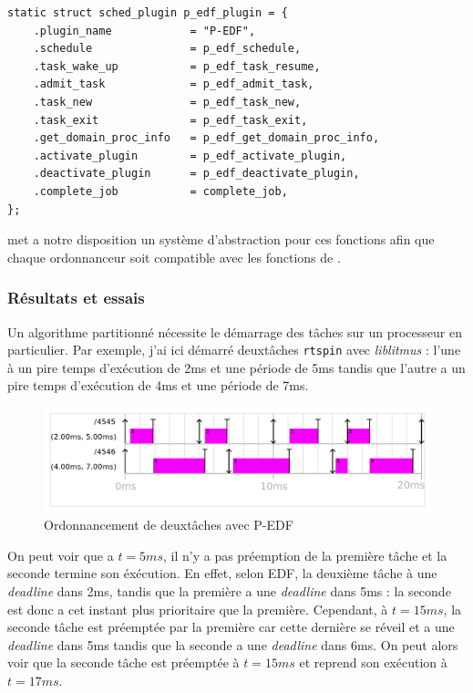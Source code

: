 \begin{lstlisting}[style=cstyle, caption={Déclaration des fonctions de l'ordonnanceur}, label={lst:decl-func-sched}]
static struct sched_plugin p_edf_plugin = {
    .plugin_name            = "P-EDF",
    .schedule               = p_edf_schedule,
    .task_wake_up           = p_edf_task_resume,
    .admit_task             = p_edf_admit_task,
    .task_new               = p_edf_task_new,
    .task_exit              = p_edf_task_exit,
    .get_domain_proc_info   = p_edf_get_domain_proc_info,
    .activate_plugin        = p_edf_activate_plugin,
    .deactivate_plugin      = p_edf_deactivate_plugin,
    .complete_job           = complete_job,
};
\end{lstlisting}

\litmus met a notre disposition un système d'abstraction pour ces fonctions afin que chaque ordonnanceur soit compatible avec les fonctions de \litmus.


\subsubsection{Résultats et essais}

Un algorithme partitionné nécessite le démarrage des tâches sur un processeur en particulier. Par exemple, j'ai ici démarré deuxtâches \texttt{rtspin} avec \textit{liblitmus} : l'une à un pire temps d’exécution de 2ms et une période de 5ms tandis que l'autre a un pire temps d’exécution de 4ms et une période de 7ms.

\begin{figure}[H]
    \centering
    \includegraphics[width=0.75\paperwidth]{Images/P-EDF-SCHEDUALIBILITY-DEMO.png}
    \caption{Ordonnancement de deuxtâches avec P-EDF}
    \label{fig:edf-schedualibility-demo}
\end{figure}

On peut voir que a $t=5ms$, il n'y a pas préemption de la première tâche et la seconde termine son éxécution. En effet, selon EDF, la deuxième tâche à une \textit{deadline} dans 2ms, tandis que la première a une \textit{deadline} dans 5ms : la seconde est donc a cet instant plus prioritaire que la première. Cependant, à $t=15ms$, la seconde tâche est préemptée par la première car cette dernière se réveil et a une \textit{deadline} dans 5ms tandis que la seconde a une \textit{deadline} dans 6ms. On peut alors voir que la seconde tâche est préemptée à $t=15ms$ et reprend son exécution à $t=17ms$. 